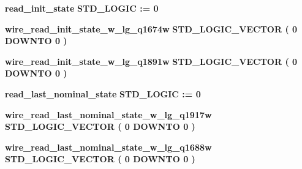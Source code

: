 \begin{DoxyCompactItemize}
\item 
{\bf read\+\_\+init\+\_\+state} {\bfseries \textcolor{comment}{S\+T\+D\+\_\+\+L\+O\+G\+IC}\textcolor{vhdlchar}{ }\textcolor{vhdlchar}{ }\textcolor{vhdlchar}{\+:}\textcolor{vhdlchar}{=}\textcolor{vhdlchar}{ }\textcolor{vhdlchar}{ }\textcolor{vhdlchar}{\textquotesingle{}}\textcolor{vhdlchar}{ } \textcolor{vhdldigit}{0} \textcolor{vhdlchar}{ }\textcolor{vhdlchar}{\textquotesingle{}}\textcolor{vhdlchar}{ }} 
\item 
{\bf wire\+\_\+read\+\_\+init\+\_\+state\+\_\+w\+\_\+lg\+\_\+q1674w} {\bfseries \textcolor{comment}{S\+T\+D\+\_\+\+L\+O\+G\+I\+C\+\_\+\+V\+E\+C\+T\+OR}\textcolor{vhdlchar}{ }\textcolor{vhdlchar}{(}\textcolor{vhdlchar}{ }\textcolor{vhdlchar}{ } \textcolor{vhdldigit}{0} \textcolor{vhdlchar}{ }\textcolor{keywordflow}{D\+O\+W\+N\+TO}\textcolor{vhdlchar}{ }\textcolor{vhdlchar}{ } \textcolor{vhdldigit}{0} \textcolor{vhdlchar}{ }\textcolor{vhdlchar}{)}\textcolor{vhdlchar}{ }} 
\item 
{\bf wire\+\_\+read\+\_\+init\+\_\+state\+\_\+w\+\_\+lg\+\_\+q1891w} {\bfseries \textcolor{comment}{S\+T\+D\+\_\+\+L\+O\+G\+I\+C\+\_\+\+V\+E\+C\+T\+OR}\textcolor{vhdlchar}{ }\textcolor{vhdlchar}{(}\textcolor{vhdlchar}{ }\textcolor{vhdlchar}{ } \textcolor{vhdldigit}{0} \textcolor{vhdlchar}{ }\textcolor{keywordflow}{D\+O\+W\+N\+TO}\textcolor{vhdlchar}{ }\textcolor{vhdlchar}{ } \textcolor{vhdldigit}{0} \textcolor{vhdlchar}{ }\textcolor{vhdlchar}{)}\textcolor{vhdlchar}{ }} 
\item 
{\bf read\+\_\+last\+\_\+nominal\+\_\+state} {\bfseries \textcolor{comment}{S\+T\+D\+\_\+\+L\+O\+G\+IC}\textcolor{vhdlchar}{ }\textcolor{vhdlchar}{ }\textcolor{vhdlchar}{\+:}\textcolor{vhdlchar}{=}\textcolor{vhdlchar}{ }\textcolor{vhdlchar}{ }\textcolor{vhdlchar}{\textquotesingle{}}\textcolor{vhdlchar}{ } \textcolor{vhdldigit}{0} \textcolor{vhdlchar}{ }\textcolor{vhdlchar}{\textquotesingle{}}\textcolor{vhdlchar}{ }} 
\item 
{\bf wire\+\_\+read\+\_\+last\+\_\+nominal\+\_\+state\+\_\+w\+\_\+lg\+\_\+q1917w} {\bfseries \textcolor{comment}{S\+T\+D\+\_\+\+L\+O\+G\+I\+C\+\_\+\+V\+E\+C\+T\+OR}\textcolor{vhdlchar}{ }\textcolor{vhdlchar}{(}\textcolor{vhdlchar}{ }\textcolor{vhdlchar}{ } \textcolor{vhdldigit}{0} \textcolor{vhdlchar}{ }\textcolor{keywordflow}{D\+O\+W\+N\+TO}\textcolor{vhdlchar}{ }\textcolor{vhdlchar}{ } \textcolor{vhdldigit}{0} \textcolor{vhdlchar}{ }\textcolor{vhdlchar}{)}\textcolor{vhdlchar}{ }} 
\item 
{\bf wire\+\_\+read\+\_\+last\+\_\+nominal\+\_\+state\+\_\+w\+\_\+lg\+\_\+q1688w} {\bfseries \textcolor{comment}{S\+T\+D\+\_\+\+L\+O\+G\+I\+C\+\_\+\+V\+E\+C\+T\+OR}\textcolor{vhdlchar}{ }\textcolor{vhdlchar}{(}\textcolor{vhdlchar}{ }\textcolor{vhdlchar}{ } \textcolor{vhdldigit}{0} \textcolor{vhdlchar}{ }\textcolor{keywordflow}{D\+O\+W\+N\+TO}\textcolor{vhdlchar}{ }\textcolor{vhdlchar}{ } \textcolor{vhdldigit}{0} \textcolor{vhdlchar}{ }\textcolor{vhdlchar}{)}\textcolor{vhdlchar}{ }} 

\end{DoxyCompactItemize}
